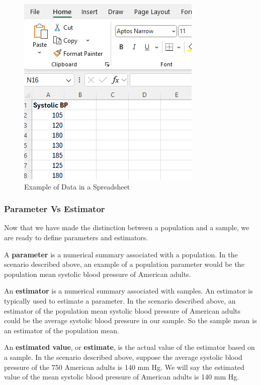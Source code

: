 \documentclass[
]{book}
\begin{document}
\begin{figure}
\centering
\includegraphics{images/07-dataframe.png}
\caption{\label{fig:07-dataframe}Example of Data in a Spreadsheet}
\end{figure}

\hypertarget{parameter-vs-estimator}{%
\subsubsection{Parameter Vs Estimator}\label{parameter-vs-estimator}}

Now that we have made the distinction between a population and a sample, we are ready to define parameters and estimators.

A \textbf{parameter} is a numerical summary associated with a population. In the scenario described above, an example of a population parameter would be the population mean systolic blood pressure of American adults.

An \textbf{estimator} is a numerical summary associated with samples. An estimator is typically used to estimate a parameter. In the scenario described above, an estimator of the population mean systolic blood pressure of American adults could be the average systolic blood pressure in our sample. So the sample mean is an estimator of the population mean.

An \textbf{estimated value}, or \textbf{estimate}, is the actual value of the estimator based on a sample. In the scenario described above, suppose the average systolic blood pressure of the 750 American adults is 140 mm Hg. We will say the estimated value of the mean systolic blood pressure of American adults is 140 mm Hg.
\end{document}
